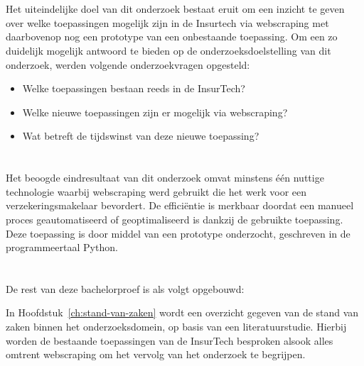 \section{}
\label{sec:onderzoeksvraag}

Het uiteindelijke doel van dit onderzoek bestaat eruit om een inzicht te geven over welke toepassingen mogelijk zijn in de Insurtech via webscraping met daarbovenop nog een prototype van een onbestaande toepassing. Om een zo duidelijk mogelijk antwoord te bieden op de onderzoeksdoelstelling van dit onderzoek, werden volgende onderzoekvragen opgesteld:
\begin{itemize}
	\item Welke toepassingen bestaan reeds in de InsurTech?
	\item Welke nieuwe toepassingen zijn er mogelijk via webscraping?
	\item Wat betreft de tijdswinst van deze nieuwe toepassing?
\end{itemize}

\section{}
\label{sec:onderzoeksdoelstelling}

Het beoogde eindresultaat van dit onderzoek omvat minstens één nuttige technologie waarbij webscraping werd gebruikt die het werk voor een verzekeringsmakelaar bevordert. De efficiëntie is merkbaar doordat een manueel proces geautomatiseerd of geoptimaliseerd is dankzij de gebruikte toepassing. Deze toepassing is door middel van een prototype onderzocht, geschreven in de programmeertaal Python.

\section{}
\label{sec:opzet-bachelorproef}


De rest van deze bachelorproef is als volgt opgebouwd:

In Hoofdstuk~\ref{ch:stand-van-zaken} wordt een overzicht gegeven van de stand van zaken binnen het onderzoeksdomein, op basis van een literatuurstudie. Hierbij worden de bestaande toepassingen van de InsurTech besproken alsook alles omtrent webscraping om het vervolg van het onderzoek te begrijpen.

